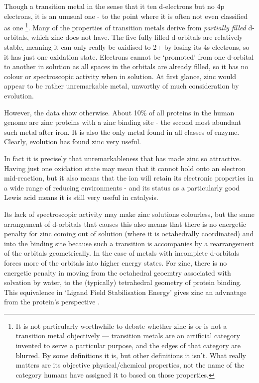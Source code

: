 Though a transition metal in the sense that it ten d-electrons but no 4p electrons, it is an unusual one - to the point where it is often not even classified as one \footnote{It is not particularly worthwhile to debate whether zinc is or is not a transition metal objectively --- transition metals are an artificial category invented to serve a particular purpose, and the edges of that category are blurred. By some definitions it is, but other definitions it isn't. What really matters are its objective physical/chemical properties, not the name of the category humans have assigned it to based on those properties.}. Many of the properties of transition metals derive from \emph{partially filled} d-orbitals, which zinc does not have. The five fully filled d-orbitals are relatively stable, meaning it can only really be oxidised to 2+ by losing its 4s electrons, so it has just one oxidation state. Electrons cannot be `promoted' from one d-orbital to another in solution as all spaces in the orbitals are already filled, so it has no colour or spectroscopic activity when in solution. At first glance, zinc would appear to be rather unremarkable metal, unworthy of much consideration by evolution.

However, the data show otherwise. About 10\% of all proteins in the human genome are zinc proteins with a zinc binding site \cite{andreini2006counting} - the second most abundant such metal after iron. It is also the only metal found in all classes of enzyme. Clearly, evolution has found zinc very useful.

In fact it is precisely that unremarkableness that has made zinc so attractive. Having just one oxidation state may mean that it cannot hold onto an electron mid-reaction, but it also means that the ion will retain its electronic properties in a wide range of reducing environments - and its status as a particularly good Lewis acid means it is still very useful in catalysis. 

Its lack of spectroscopic activity may make zinc solutions colourless, but the same arrangement of d-orbitals that causes this also means that there is no energetic penalty for zinc coming out of solution (where it is octahedrally coordinated) and into the binding site because such a transition is accompanies by a rearrangement of the orbitals geometrically. In the case of metals with incomplete d-orbitals forces more of the orbitals into higher energy states. For zinc, there is no energetic penalty in moving from the octahedral geoemtry associated with solvation by water, to the (typically) tetrahedral geometry of protein binding. This equivalence in `Ligand Field Stabilisation Energy' gives zinc an advnatage from the protein's perspective \cite{lachenmann2004zinc}.

